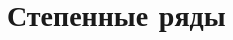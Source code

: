 \documentclass[../main.tex]{subfiles}
\begin{document}
 \chapter{Степенные ряды}
 
 
 
\end{document}
